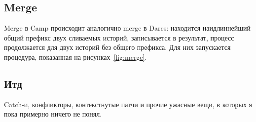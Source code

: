 \subsection{Merge}

Merge в Camp происходит аналогично merge в Darcs: находится
наидлиннейший общий префикс двух сливаемых историй, записывается в
результат, процесс продолжается для двух историй без общего префикса.
Для них запускается процедура, показанная на рисунках~\ref{fig:merge}.

\subsection{Итд}

Catch-и, конфликторы, контекстнутые патчи и прочие ужасные вещи,
в которых я пока примерно ничего не понял.